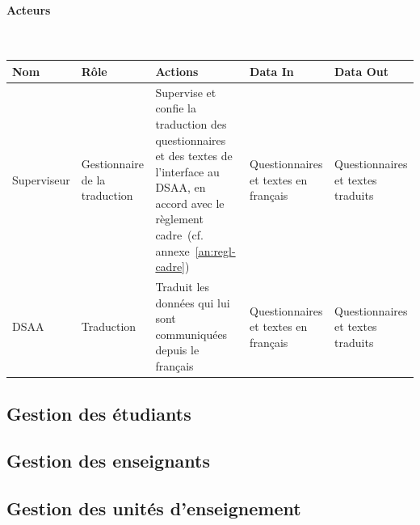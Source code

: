 \documentclass[a4paper,11pt]{report}
\begin{document}
\paragraph{Acteurs}~\newline{}

\begin{tabularx}{\linewidth}{|X|X|X|X|X|} \hline
Nom & Rôle & Actions & Data In & Data Out \\ \hline 
Superviseur & Gestionnaire de la traduction & Supervise et confie la traduction des questionnaires et des textes de l'interface au DSAA, en accord avec le règlement cadre~(cf. annexe~\ref{an:regl-cadre}) & Questionnaires et textes en français & Questionnaires et textes traduits \\ 
DSAA & Traduction & Traduit les données qui lui sont communiquées depuis le français & Questionnaires et textes en français & Questionnaires et textes traduits \\ \hline
\end{tabularx}





\subsection{Gestion des étudiants}




\subsection{Gestion des enseignants}




\subsection{Gestion des unités d'enseignement}
\end{document}
